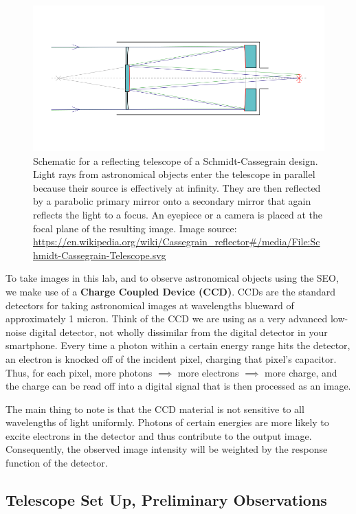\begin{figure}
	\centering
	\includegraphics[scale = 0.5]{small-optical-telescopes/Schmidt-Cassegrain-Telescope.png}
	\caption{Schematic for a reflecting telescope of a Schmidt-Cassegrain design. 
		Light rays from astronomical objects enter the telescope in parallel because their source is effectively at infinity. They are then reflected by a parabolic primary mirror onto a secondary mirror that again reflects the light to a focus. An eyepiece or a camera is placed at the focal plane of the resulting image. Image source: \url{https://en.wikipedia.org/wiki/Cassegrain\_reflector\#/media/File:Schmidt-Cassegrain-Telescope.svg}}\label{sot:fig:schmidt}
\end{figure}

To take images in this lab, and to observe astronomical objects using the SEO, we make use of a \textbf{Charge Coupled Device (CCD)}. CCDs are the standard detectors for taking astronomical images at wavelengths blueward of approximately 1 micron. Think of the CCD we are using as a
very advanced low-noise digital detector, not wholly dissimilar from the digital detector in your
smartphone. Every time a photon within a certain energy range hits the detector, an electron is knocked off of the incident pixel, charging that pixel's capacitor. Thus, for each pixel, more photons $\implies$ more electrons $\implies$ more charge, and the charge can be read off into a digital signal that is then processed as an image. 

The main thing to note is that the CCD material is not sensitive to all wavelengths of light uniformly. Photons of certain energies are more likely to excite electrons in the detector and thus contribute to the output image. Consequently, the observed image intensity will be weighted by the response function of the detector.

\subsection{Telescope Set Up, Preliminary Observations}\label{ai:sec:setup}

